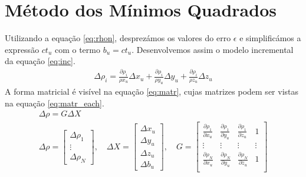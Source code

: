 \documentclass[palatino]{ist-report}
\begin{document}








\pagebreak

\section{Método dos Mínimos Quadrados}

Utilizando a equação \ref{eq:rhon}, desprezámos os valores do erro $\epsilon$ e simplificámos a expressão $ct_u$ com o termo $b_u = ct_u$. Desenvolvemos assim o modelo incremental da equação \ref{eq:inc}.
\begin{gather}\label{eq:inc}
    \Delta \rho_i = \frac{\partial\rho_i}{\rho x_u}\Delta x_u + \frac{\partial\rho_i}{\rho y_u}\Delta y_u + \frac{\partial\rho_i}{\rho z_u}\Delta z_u
\end{gather}
A forma matricial é visível na equação \ref{eq:matr}, cujas matrizes podem ser vistas na equação \ref{eq:matr_each}.
\begin{subequations}
\begin{gather}
    \Delta\rho = G\Delta X \label{eq:matr} \\
    \Delta\rho = \left[\begin{matrix}\Delta\rho_1 \\ \vdots \\ \Delta\rho_N\end{matrix}\right], \quad \Delta X = \left[\begin{matrix}\Delta x_u \\ \Delta y_u \\ \Delta z_u \\ \Delta b_u\end{matrix}\right], \quad G = \left[\begin{matrix}
        \frac{\partial\rho_1}{\partial x_u} & \frac{\partial\rho_1}{\partial y_u} & \frac{\partial\rho_1}{\partial z_u} & 1 \\
        \vdots & \vdots & \vdots & \vdots \\
        \frac{\partial\rho_N}{\partial x_u} & \frac{\partial\rho_N}{\partial y_u} & \frac{\partial\rho_N}{\partial z_u} & 1 \\
    \end{matrix}\right] \label{eq:matr_each}
\end{gather}
\end{subequations}
\end{document}
